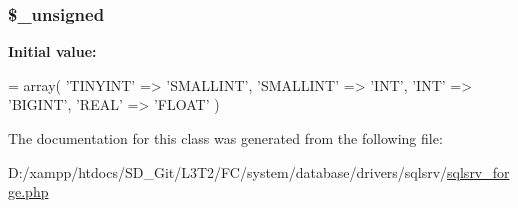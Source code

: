 \subsubsection[{\$\+\_\+unsigned}]{\setlength{\rightskip}{0pt plus 5cm}\$\+\_\+unsigned\hspace{0.3cm}{\ttfamily [protected]}}\label{class_c_i___d_b__sqlsrv__forge_aae977ae6d61fa183f0b25422b6ddc31c}
{\bfseries Initial value\+:}
\begin{DoxyCode}
= array(
        \textcolor{stringliteral}{'TINYINT'}   => \textcolor{stringliteral}{'SMALLINT'},
        \textcolor{stringliteral}{'SMALLINT'}  => \textcolor{stringliteral}{'INT'},
        \textcolor{stringliteral}{'INT'}       => \textcolor{stringliteral}{'BIGINT'},
        \textcolor{stringliteral}{'REAL'}      => \textcolor{stringliteral}{'FLOAT'}
    )
\end{DoxyCode}


The documentation for this class was generated from the following file\+:\begin{DoxyCompactItemize}
\item 
D\+:/xampp/htdocs/\+S\+D\+\_\+\+Git/\+L3\+T2/\+F\+C/system/database/drivers/sqlsrv/\hyperlink{sqlsrv__forge_8php}{sqlsrv\+\_\+forge.\+php}\end{DoxyCompactItemize}
